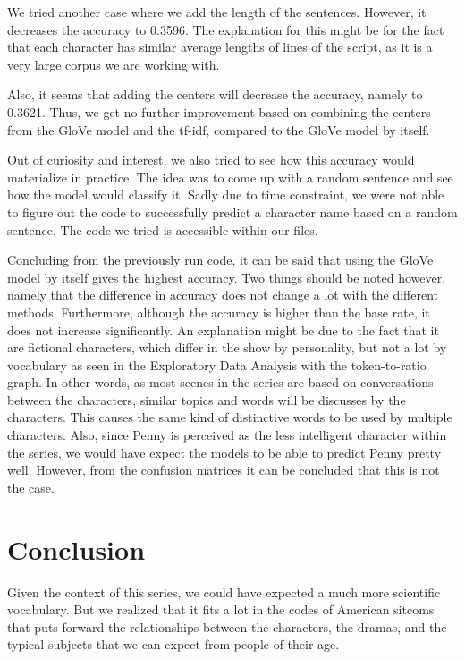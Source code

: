 \documentclass[
]{article}
\begin{document}
We tried another case where we add the length of the sentences. However,
it decreases the accuracy to 0.3596. The explanation for this might be
for the fact that each character has similar average lengths of lines of
the script, as it is a very large corpus we are working with.

Also, it seems that adding the centers will decrease the accuracy,
namely to 0.3621. Thus, we get no further improvement based on combining
the centers from the GloVe model and the tf-idf, compared to the GloVe
model by itself.

Out of curiosity and interest, we also tried to see how this accuracy
would materialize in practice. The idea was to come up with a random
sentence and see how the model would classify it. Sadly due to time
constraint, we were not able to figure out the code to successfully
predict a character name based on a random sentence. The code we tried
is accessible within our files.

Concluding from the previously run code, it can be said that using the
GloVe model by itself gives the highest accuracy. Two things should be
noted however, namely that the difference in accuracy does not change a
lot with the different methods. Furthermore, although the accuracy is
higher than the base rate, it does not increase significantly. An
explanation might be due to the fact that it are fictional characters,
which differ in the show by personality, but not a lot by vocabulary as
seen in the Exploratory Data Analysis with the token-to-ratio graph. In
other words, as most scenes in the series are based on conversations
between the characters, similar topics and words will be discusses by
the characters. This causes the same kind of distinctive words to be
used by multiple characters. Also, since Penny is perceived as the less
intelligent character within the series, we would have expect the models
to be able to predict Penny pretty well. However, from the confusion
matrices it can be concluded that this is not the case.

\hypertarget{conclusion}{%
\section{Conclusion}\label{conclusion}}

Given the context of this series, we could have expected a much more
scientific vocabulary. But we realized that it fits a lot in the codes
of American sitcoms that puts forward the relationships between the
characters, the dramas, and the typical subjects that we can expect from
people of their age.
\end{document}
